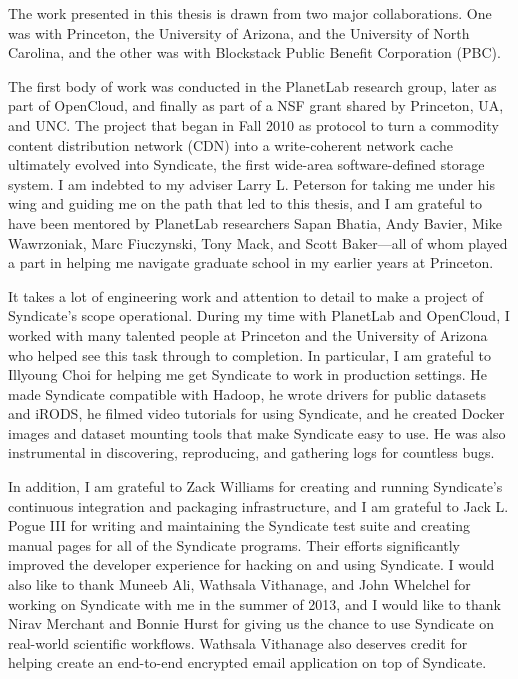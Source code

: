 The work presented in this thesis is drawn from two major collaborations.
One was with Princeton, the University of Arizona, and the University of North Carolina, 
and the other was with Blockstack Public Benefit Corporation (PBC).

The first body of work was conducted in the PlanetLab research
group, later as part of OpenCloud, and finally as part of a NSF grant shared by
Princeton, UA, and UNC.  The project that began in Fall 2010 as
protocol to turn a commodity content distribution network (CDN) into a write-coherent 
network cache ultimately evolved into Syndicate, the first wide-area
software-defined storage system.  I am indebted to my adviser Larry L. Peterson
for taking me under his wing and guiding me on the path that led to this
thesis, and I am grateful to have been mentored by 
PlanetLab researchers Sapan Bhatia, Andy Bavier, Mike Wawrzoniak, Marc
Fiuczynski, Tony Mack, and Scott Baker---all of whom played a part in
helping me navigate graduate school in my earlier years at Princeton.

It takes a lot of engineering work and attention to
detail to make a project of Syndicate's scope operational.
During my time with PlanetLab and OpenCloud, I worked with many talented people
at Princeton and the University of Arizona who helped 
see this task through to completion.  In particular, I am grateful to Illyoung Choi for helping me get
Syndicate to work in production settings.  He made Syndicate compatible with Hadoop,
he wrote drivers for public datasets and iRODS, he filmed video tutorials 
for using Syndicate, and he created Docker images and dataset mounting tools
that make Syndicate easy to use.  He was also instrumental in discovering,
reproducing, and gathering logs for countless bugs.

In addition, I am grateful to Zack Williams
for creating and running Syndicate's continuous integration and packaging
infrastructure, and I am grateful to Jack L. Pogue III for writing
and maintaining the Syndicate test suite and creating manual pages for all of
the Syndicate programs.  Their efforts significantly improved the developer
experience for hacking on and using Syndicate.
I would also like to thank Muneeb Ali, Wathsala Vithanage,
and John Whelchel for working on Syndicate with me in the summer of 2013,
and I would like to thank Nirav Merchant and Bonnie Hurst
for giving us the chance to use Syndicate on real-world scientific workflows.
Wathsala Vithanage also deserves credit for helping create an end-to-end
encrypted email application on top of Syndicate.

